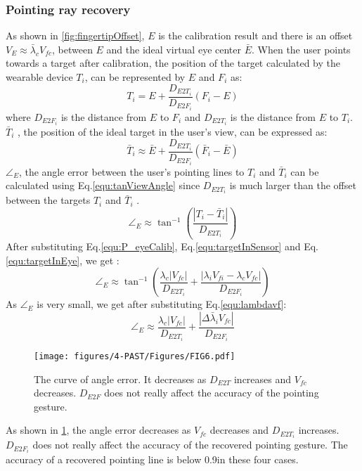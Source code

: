 \subsubsection{Pointing ray recovery} \label{sec:4:PASTrecovery}
As shown in \figurename{ \ref{fig:fingertipOffset}}, $E$ is the calibration result and there is an offset $V_{E} \approx \bar\lambda_c V_{fc}$, between $E$ and the ideal virtual eye center ${\bar E}$. 
When the user points towards a target after calibration, the position of the target calculated by the wearable device $T_i$, can be represented by $E$ and $F_i$ as:
\begin{equation} \label{equ:targetInSensor}
T_i = E+ \frac{D_{E2T_i}}{D_{E2F_i}}  \left( {F_i - E} \right)
\end{equation}
where $D_{E2F_i}$ is the distance from $E$ to ${{F_i}}$ and $D_{E2T_i}$ is the distance from ${E}$ to ${T_i}$. \\
$\bar T_i$ , the position of the ideal target in the user's view, can be expressed as:
\begin{equation} \label{equ:targetInEye}
\bar T_i \approx {\bar E} + \frac{D_{E2T_i}}{D_{E2F_i}}  \left( {{\bar F_i} - {\bar E}} \right)
\end{equation}
${\angle}_{E}$, the angle error between the user's pointing lines to $T_i$ and $\bar T_i$ can be calculated using Eq.\ref{equ:tanViewAngle} since $D_{E2T_i}$ is much larger than the offset between the targets $T_i$ and $\bar T_i$ . 
\begin{equation} \label{equ:tanViewAngle}
{\angle}_{E} \approx \tan^{-1} \left( {\frac{| {T_i - \bar T_i}| }{D_{E2T_i}} } \right)
\end{equation}
After substituting Eq.\ref{equ:P_eyeCalib}, Eq.\ref{equ:targetInSensor} and Eq.\ref{equ:targetInEye}, we get :
\begin{equation} \label{equ:tanViewAngle1}
{\angle}_{E} \approx \tan^{-1} \left( {{\frac{{\lambda_c{|V_{fc}|} }}{D_{E2T_i}} + \frac{{|\lambda_i V_{fi} - \lambda_c V_{fc}|} }{D_{E2F_i}}} } \right)
\end{equation}
As ${\angle}_{E}$ is very small, we get after substituting Eq.\ref{equ:lambdavf}:
\begin{equation} \label{equ:ViewAngleError}
{\angle}_{E} \approx \frac{ {\lambda_c{|V_{fc}|}} }{D_{E2T_i}} + \frac{ {|\Delta \bar \lambda_i V_{fc}|} }{D_{E2F_i}}
\end{equation}
\begin{figure} 
	\centering
	\texttt{[image: figures/4-PAST/Figures/FIG6.pdf]}
	\caption{The curve of angle error. It decreases as $D_{E2T}$ increases and $V_{fc}$ decreases. $D_{E2F}$ does not really affect the accuracy of the pointing gesture.}
	\label{fig:evaluatinOfPointing}
\end{figure}
As shown in \figurename{ \ref{fig:evaluatinOfPointing}}, the angle error decreases as $V_{fc}$ decreases and $D_{E2T_i}$ increases. $D_{E2F_i}$ does not really affect the accuracy of the recovered pointing gesture. The accuracy of a recovered pointing line is below 0.9\degree in these four cases.

